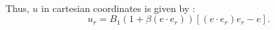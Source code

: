 \documentclass{article}
\begin{document}
\begin{align*}
\end{align*}

\vspace{0.5 cm}
Thus, $u$ in cartesian coordinates is given by :
\begin{equation*}
\boxed{u_r = B_1(1+\beta (e\cdot e_r)) [(e\cdot e_r)e_r - e].}
\end{equation*}
\end{document}
